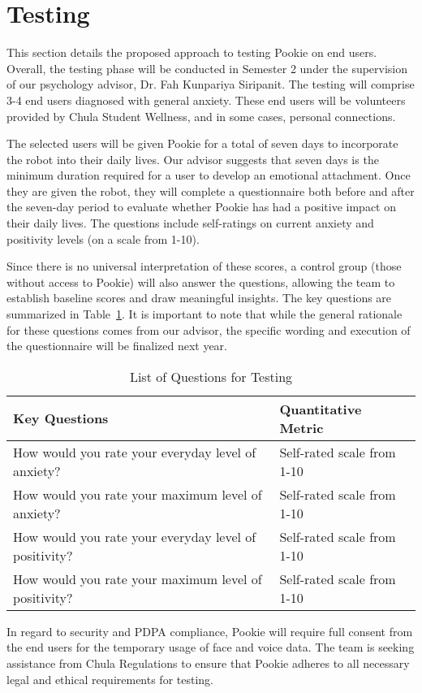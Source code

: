 \section{Testing}

This section details the proposed approach to testing Pookie on end users. Overall, the testing phase will be conducted in Semester 2 under the supervision of our psychology advisor, Dr. Fah Kunpariya Siripanit. The testing will comprise 3-4 end users diagnosed with general anxiety. These end users will be volunteers provided by Chula Student Wellness, and in some cases, personal connections. 

The selected users will be given Pookie for a total of seven days to incorporate the robot into their daily lives. Our advisor suggests that seven days is the minimum duration required for a user to develop an emotional attachment. Once they are given the robot, they will complete a questionnaire both before and after the seven-day period to evaluate whether Pookie has had a positive impact on their daily lives. The questions include self-ratings on current anxiety and positivity levels (on a scale from 1-10). 

Since there is no universal interpretation of these scores, a control group (those without access to Pookie) will also answer the questions, allowing the team to establish baseline scores and draw meaningful insights. The key questions are summarized in Table~\ref{table:questions}. It is important to note that while the general rationale for these questions comes from our advisor, the specific wording and execution of the questionnaire will be finalized next year.

\begin{table}[h]
\centering
\caption{List of Questions for Testing}
\label{table:questions}
\begin{tabular}{|l|l|}
\hline
\textbf{Key Questions} & \textbf{Quantitative Metric} \\ \hline
How would you rate your everyday level of anxiety? & Self-rated scale from 1-10 \\ \hline
How would you rate your maximum level of anxiety? & Self-rated scale from 1-10 \\ \hline
How would you rate your everyday level of positivity? & Self-rated scale from 1-10 \\ \hline
How would you rate your maximum level of positivity? & Self-rated scale from 1-10 \\ \hline
\end{tabular}
\end{table}

In regard to security and PDPA compliance, Pookie will require full consent from the end users for the temporary usage of face and voice data. The team is seeking assistance from Chula Regulations to ensure that Pookie adheres to all necessary legal and ethical requirements for testing.
